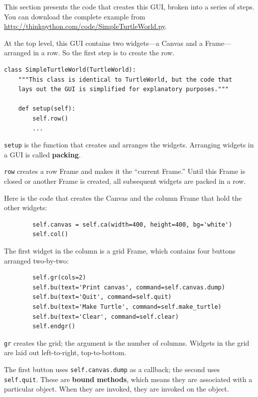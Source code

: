 \documentclass[10pt]{book}
\begin{document}
\begin{CJK}{UTF8}{gbsn}
This section presents the code that creates this GUI, broken into a
series of steps.  You can download the complete example
from \url{http://thinkpython.com/code/SimpleTurtleWorld.py}.

At the top level, this GUI contains two widgets---a Canvas and a
Frame---arranged in a row.  So the first step is to create the row.

\begin{verbatim}
class SimpleTurtleWorld(TurtleWorld):
    """This class is identical to TurtleWorld, but the code that
    lays out the GUI is simplified for explanatory purposes."""

    def setup(self):
        self.row()
        ...
\end{verbatim}
%
{\tt setup} is the function that creates and arranges the widgets.
Arranging widgets in a GUI is called {\bf packing}.

{\tt row} creates a row Frame and makes it the ``current Frame.''
Until this Frame is closed or another Frame is created, all
subsequent widgets are packed in a row.

Here is the code that creates the Canvas and the column Frame
that hold the other widgets:

\begin{verbatim}
        self.canvas = self.ca(width=400, height=400, bg='white')
        self.col()
\end{verbatim}
%
The first widget in the column is a grid Frame, which contains
four buttons arranged two-by-two:

\begin{verbatim}
        self.gr(cols=2)
        self.bu(text='Print canvas', command=self.canvas.dump)
        self.bu(text='Quit', command=self.quit)
        self.bu(text='Make Turtle', command=self.make_turtle)
        self.bu(text='Clear', command=self.clear)
        self.endgr()
\end{verbatim}
%
{\tt gr} creates the grid; the argument is the number of
columns.  Widgets in the grid are
laid out left-to-right, top-to-bottom.

The first button uses {\tt self.canvas.dump} as a callback; the second
uses {\tt self.quit}.  These are {\bf bound methods}, which means they
are associated with a particular object.  When they are invoked, they
are invoked on the object.


\end{CJK}
\end{document}
